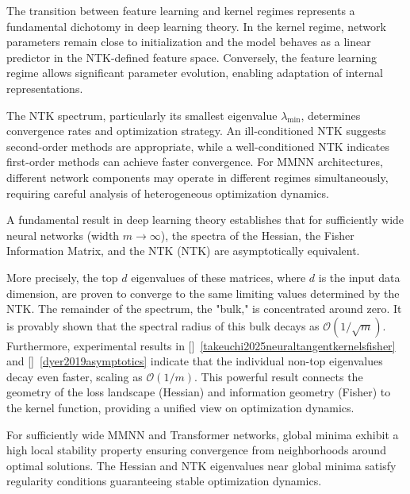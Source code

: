 \documentclass[11pt]{article}
\begin{document}
The transition between feature learning and kernel regimes represents a fundamental dichotomy in deep learning theory. In the kernel regime, network parameters remain close to initialization and the model behaves as a linear predictor in the NTK-defined feature space. Conversely, the feature learning regime allows significant parameter evolution, enabling adaptation of internal representations.

The NTK spectrum, particularly its smallest eigenvalue $\lambda_{\min}$, determines convergence rates and optimization strategy. An ill-conditioned NTK suggests second-order methods are appropriate, while a well-conditioned NTK indicates first-order methods can achieve faster convergence. For MMNN architectures, different network components may operate in different regimes simultaneously, requiring careful analysis of heterogeneous optimization dynamics.

\begin{tcolorbox}[colback=red!5,colframe=red!80!black,title={\textbf{Theorem: Spectral Equivalence of NTK, Hessian, and Fisher Matrix}},enhanced,drop shadow,boxrule=2pt]
A fundamental result in deep learning theory establishes that for sufficiently wide neural networks (width $m \to \infty$), the spectra of the Hessian, the Fisher Information Matrix, and the NTK (NTK) are asymptotically equivalent.

More precisely, the top $d$ eigenvalues of these matrices, where $d$ is the input data dimension, are proven to converge to the same limiting values determined by the NTK. The remainder of the spectrum, the "bulk," is concentrated around zero. It is provably shown that the spectral radius of this bulk decays as $\mathcal{O}(1/\sqrt{m})$. Furthermore, experimental results in []~\ref{takeuchi2025neuraltangentkernelsfisher} and []~\ref{dyer2019asymptotics} indicate that the individual non-top eigenvalues decay even faster, scaling as $\mathcal{O}(1/m)$. This powerful result connects the geometry of the loss landscape (Hessian) and information geometry (Fisher) to the kernel function, providing a unified view on optimization dynamics.
\end{tcolorbox}


\begin{tcolorbox}[colback=green!15,colframe=green!80!black,title={\textbf{Conjecture from Pr Haizhao Yang: Global Minima Stability}},enhanced,drop shadow,boxrule=2pt]
For sufficiently wide MMNN and Transformer networks, global minima exhibit a high local stability property ensuring convergence from neighborhoods around optimal solutions. The Hessian and NTK eigenvalues near global minima satisfy regularity conditions guaranteeing stable optimization dynamics.
\end{tcolorbox}
\end{document}
